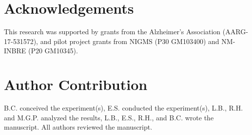 \documentclass[fleqn,10pt]{wlscirep}
\begin{document}

\section*{Acknowledgements}
This research was supported by grants from the Alzheimer’s Association (AARG-17-531572), and pilot project grants from NIGMS (P30 GM103400) and NM-INBRE (P20 GM10345).

\section*{Author Contribution}
B.C. conceived the experiment(s),  E.S. conducted the experiment(s), L.B., R.H. and M.G.P. analyzed the results, L.B., E.S., R.H., and B.C. wrote the manuscript.  All authors reviewed the manuscript. 



\end{document}
